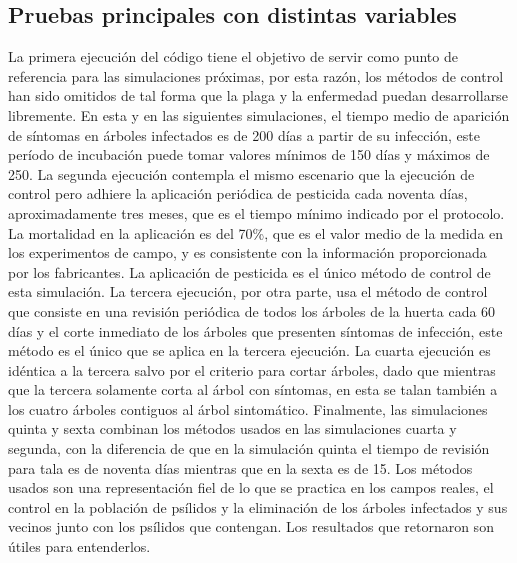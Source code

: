 \subsection{Pruebas principales con distintas variables}



La primera ejecución del código tiene el objetivo de servir como punto de referencia para las simulaciones próximas, por esta razón, los métodos de control han sido omitidos de tal forma que la plaga y la enfermedad puedan desarrollarse libremente. En esta y en las siguientes simulaciones, el tiempo medio de aparición de síntomas en árboles infectados es de 200 días a partir de su infección, este período de incubación puede tomar valores mínimos de 150 días y máximos de 250.
La segunda ejecución contempla el mismo escenario que la ejecución de control pero adhiere la aplicación periódica de pesticida cada noventa días, aproximadamente tres meses, que es el tiempo mínimo indicado por el protocolo. La mortalidad en la aplicación es del 70\%, que es el valor medio de la medida en los experimentos de campo, y es consistente con la información proporcionada por los fabricantes. La aplicación de pesticida es el único método de control de esta simulación.
La tercera ejecución, por otra parte, usa el método de control que consiste en una revisión periódica de todos los árboles de la huerta cada 60 días y el corte inmediato de los árboles que presenten síntomas de infección, este método es el único que se aplica en la tercera ejecución.
La cuarta ejecución es idéntica a la tercera salvo por el criterio para cortar árboles, dado que mientras que la tercera solamente corta al árbol con síntomas, en esta se talan también a los cuatro árboles contiguos al árbol sintomático.
Finalmente, las simulaciones quinta y sexta combinan los métodos usados en las simulaciones cuarta y segunda, con la diferencia de que en la simulación quinta el tiempo de revisión para tala es de noventa días mientras que en la sexta es de 15. Los métodos usados son una representación fiel de lo que se practica en los campos reales, el control en la población de psílidos y la eliminación de los árboles infectados y sus vecinos junto con los psílidos que contengan. Los resultados que retornaron son útiles para entenderlos.








